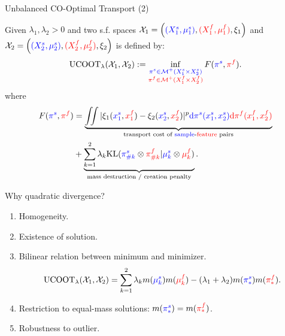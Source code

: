 \documentclass{beamer}
\newcommand{\ucoot}{\text{UCOOT}}
\newcommand{\cX}{\mathcal X}
\newcommand{\cM}{\mathcal M}
\newcommand{\pis}{{\color{blue}{\pi^s}}}
\newcommand{\pif}{{\color{red}{\pi^f}}}
\begin{document}
\begin{frame}{Unbalanced CO-Optimal Transport (2)}
\tiny
  \begin{definition}[UCOOT]
      Given $\lambda_1, \lambda_2 >0$ and two s.f. spaces
      $\cX_1 = \left({\color{blue}{(X_1^s, \mu_1^s)}}, {\color{red}{(X_1^f, \mu_1^f)}}, \xi_1 \right)$
      and $\cX_2 = \left({\color{blue}{(X_2^s, \mu_2^s)}}, {\color{red}{(X_2^f, \mu_2^f)}}, \xi_2 \right)$ is defined by:
  \begin{align*}
  \label{eq:ucoot}
      \ucoot_{\lambda}(\cX_1, \cX_2) :=
    \inf_{\substack{{\color{blue}{\pi^s \in \cM^+(X_1^s \times X_2^s)}}
    \\ {\color{red}{\pi^f \in \cM^+(X_1^f \times X_2^f)}}}}
    F(\pis, \pif).
  \end{align*}
  where
  \begin{align*}
      F(\pis, \pif) &= \underbrace{\iint
      |\xi_1({\color{blue}{x_1^s}}, {\color{red}{x_1^f}}) - \xi_2({\color{blue}{x_2^s}}, {\color{red}{x_2^f}})|^p {\color{blue}{\mathrm d\pi^s(x_1^s, x_2^s)}}
      {\color{red}{\mathrm d \pi^f(x_1^f, x_2^f)}}}_{\text{transport cost of {\color{blue}{sample}}-{\color{red}{feature}} pairs}} \\
      &+ \underbrace{\sum_{k=1}^2\lambda_k \text{KL}({\color{blue}{\pi^s_{\# k}}} \otimes {\color{red}{\pi^f_{\# k}}} \vert {\color{blue}{\mu^s_k}} \otimes {\color{red}{\mu^f_k}})}_{\text{mass destruction / creation penalty}}.
  \end{align*}
  \end{definition}
\end{frame}

\begin{frame}{Why quadratic divergence?}
  \tiny
\begin{enumerate}
  \item Homogeneity.
  \item Existence of solution.
  \item Bilinear relation between minimum and minimizer.
  \begin{align*}
    \ucoot_{\lambda}(\cX_1, \cX_2) =
    \sum_{k=1}^2 \lambda_k m({\color{blue}{\mu_k^s}}) m({\color{red}{\mu_k^f}})
    - (\lambda_1 + \lambda_2) m({\color{blue}{\pi^s_*}}) m({\color{red}{\pi^f_*}}).
  \end{align*}
  \item Restriction to equal-mass solutions: $m({\color{blue}{\pi^s_*}}) = m({\color{red}{\pi^f_*}})$.
  \item Robustness to outlier.
\end{enumerate}

\end{frame}
\end{document}
